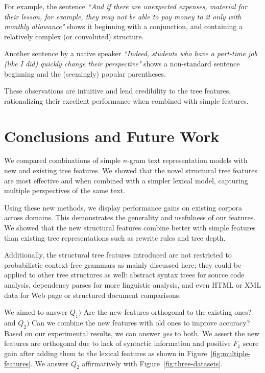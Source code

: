 \documentclass[conference]{IEEEtran}
\begin{document}
For example, the sentence \emph{``And if there are unexpected expenses, material
for their lesson, for example, they may not be able to pay money to it only with
monthly allowance"} shows it beginning with a conjunction, and containing a
relatively complex (or convoluted) structure.

Another sentence by a native speaker \emph{``Indeed, students who have a
part-time job (like I did) quickly change their perspective"} shows a
non-standard sentence beginning and the (seemingly) popular parentheses.

These observations are intuitive and lend credibility to the tree features,
rationalizing their excellent performance when combined with simple features.

\section{Conclusions and Future Work}

We compared combinations of simple $n$-gram text representation models with new
and existing tree features. We showed that the novel structural tree features
are most effective and when combined with a simpler lexical model, capturing
multiple perspectives of the same text.

Using these new methods, we display performance gains on existing corpora
across domains. This demonstrates the generality and usefulness of our features.
We showed that the new structural features combine better with simple features
than existing tree representations such as rewrite rules and tree depth.

Additionally, the structural tree features introduced are not restricted to
probabilistic context-free grammars as mainly discussed here; they could be
applied to other tree structures as well: abstract syntax trees for source code
analysis, dependency parses for more linguistic analysis, and even HTML or XML
data for Web page or structured document comparisons.

We aimed to answer $Q_1)$ Are the new features orthogonal to the existing ones?
and $Q_2)$ Can we combine the new features with old ones to improve accuracy?
Based on our experimental results, we can answer \emph{yes} to both. We assert
the new features are orthogonal due to lack of syntactic information and
positive $F_1$ score gain after adding them to the lexical features as shown in
Figure~\ref{fig:multiple-features}. We answer $Q_2$ affirmatively with
Figure~\ref{fig:three-datasets}.
\end{document}
